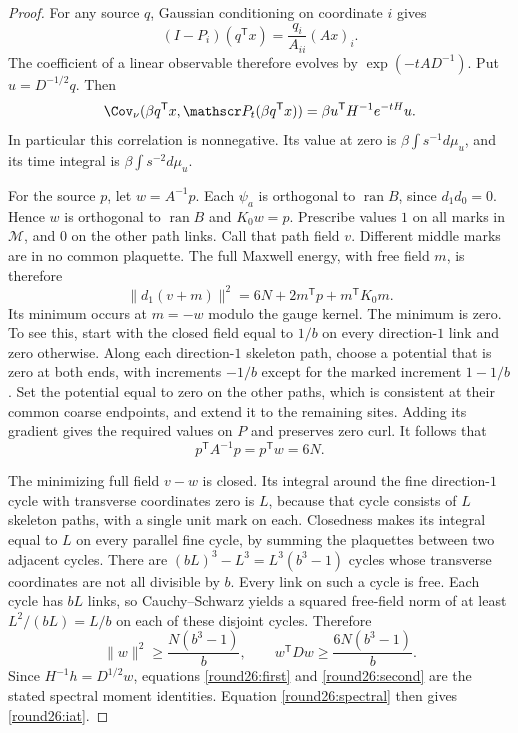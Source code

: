 \begin{proof}
For any source $q$, Gaussian conditioning on coordinate $i$ gives
\[
 (I-P_i)(q^{\mathsf T}x)=\frac{q_i}{A_{ii}}(Ax)_i.
\]
The coefficient of a linear observable therefore evolves by
$\exp(-tAD^{-1})$. Put $u=D^{-1/2}q$. Then
\begin{equation}\label{round26:spectral}
 \Cov_\nu(\beta q^{\mathsf T}x,
             \mathscr P_t(\beta q^{\mathsf T}x))
   =\beta u^{\mathsf T}H^{-1}e^{-tH}u.
\end{equation}
In particular this correlation is nonnegative. Its value at zero is
$\beta\int s^{-1}d\mu_u$, and its time integral is
$\beta\int s^{-2}d\mu_u$.

For the source $p$, let $w=A^{-1}p$. Each $\psi_a$ is orthogonal to
$\operatorname{ran}B$, since $d_1d_0=0$. Hence $w$ is orthogonal to
$\operatorname{ran}B$ and $K_0w=p$.
Prescribe values $1$ on all marks in $\mathcal M$, and $0$ on the other
path links. Call that path field $v$. Different middle marks are in no
common plaquette. The full Maxwell energy, with free field $m$, is
therefore
\[
 \|d_1(v+m)\|^2=6N+2m^{\mathsf T}p+m^{\mathsf T}K_0m.
\]
Its minimum occurs at $m=-w$ modulo the gauge kernel.
The minimum is zero. To see this, start with the closed field equal to
$1/b$ on every direction-$1$ link and zero otherwise. Along each
direction-$1$ skeleton path, choose a potential that is zero at both
ends, with increments $-1/b$ except for the marked increment $1-1/b$.
Set the potential equal to zero on the other paths, which is consistent
at their common coarse endpoints, and extend it to the remaining sites.
Adding its gradient gives the required values on $P$ and preserves zero
curl. It follows that
\begin{equation}\label{round26:first}
 p^{\mathsf T}A^{-1}p=p^{\mathsf T}w=6N.
\end{equation}

The minimizing full field $v-w$ is closed. Its integral around the fine
direction-$1$ cycle with transverse coordinates zero is $L$, because
that cycle consists of $L$ skeleton paths, with a single unit mark on
each. Closedness makes its integral equal to $L$ on every parallel fine
cycle, by summing the plaquettes between two adjacent cycles.
There are $(bL)^3-L^3=L^3(b^3-1)$ cycles whose transverse coordinates
are not all divisible by $b$. Every link on such a cycle is free. Each
cycle has $bL$ links, so Cauchy--Schwarz yields a squared free-field norm
of at least $L^2/(bL)=L/b$ on each of these disjoint cycles. Therefore
\begin{equation}\label{round26:second}
 \|w\|^2\ge\frac{N(b^3-1)}b,
 \qquad w^{\mathsf T}Dw\ge\frac{6N(b^3-1)}b.
\end{equation}
Since $H^{-1}h=D^{1/2}w$, equations \eqref{round26:first} and \eqref{round26:second}
are the stated spectral moment identities. Equation \eqref{round26:spectral}
then gives \eqref{round26:iat}.


\end{proof}
